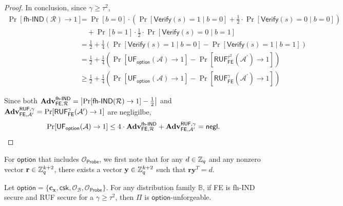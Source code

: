\begin{proof}
In conclusion, since $\gamma \geq \tau^2$,
\begin{align*}
	\Pr[\textsf{fh-IND}(\mathcal{R}) \to 1] 
	&= \Pr[b = 0] \cdot \left( \Pr[\textsf{Verify}(s) = 1 \mid b = 0] + \frac{1}{2} \cdot \Pr[\textsf{Verify}(s) = 0 \mid b = 0] \right) \\
	&\quad + \Pr[b = 1] \cdot \frac{1}{2} \cdot \Pr[\textsf{Verify}(s) = 0 \mid b = 1] \\
	&= \frac{1}{2} + \frac{1}{4} \left( \Pr[\textsf{Verify}(s) = 1 \mid b = 0] - \Pr[\textsf{Verify}(s) = 1 \mid b = 1] \right) \\
	&= \frac{1}{2} + \frac{1}{4} \left( \Pr[\textsf{UF}_{\textsf{option}}(\mathcal{A}) \to 1] - \Pr[\textsf{RUF}^{\tau^2}_{\textsf{FE}}(\mathcal{A}^\prime) \to 1 ] \right) \\
	&\geq \frac{1}{2} + \frac{1}{4} \left( \Pr[\textsf{UF}_\textsf{option}(\mathcal{A}) \to 1] - \Pr[\textsf{RUF}^{\gamma}_{\textsf{FE}}(\mathcal{A}^\prime) \to 1 ] \right)
\end{align*}

\noindent Since both $\mathbf{Adv}_{\textsf{FE}, \mathcal{R}}^\textsf{fh-IND} = \left| \Pr[\textsf{fh-IND}(\mathcal{R}) \to 1] - \frac{1}{2} \right|$ and $\mathbf{Adv}_{\textsf{FE}, \mathcal{A}^\prime}^{\textsf{RUF}, \gamma} = \Pr[\textsf{RUF}^\gamma_{\textsf{FE}}(\mathcal{A}^\prime) \to 1 ]$ are negligilbe,
\[
	\Pr[\textsf{UF}_\textsf{option}(\mathcal{A}) \to 1] \leq 4 \cdot \mathbf{Adv}_{\textsf{FE}, \mathcal{R}}^\textsf{fh-IND} + \mathbf{Adv}_{\textsf{FE}, \mathcal{A}^\prime}^{\textsf{RUF}, \gamma} = \mathsf{negl}.
\]

\end{proof}


For $\textsf{option}$ that includes $\mathcal{O}_{\textsf{Probe}}$, we first note that for any $d \in \mathbb{Z}_q$ and any nonzero vector $\mathbf{r} \in \mathbb{Z}_q^{k+2}$, there exists a vector $\mathbf{y} \in \mathbb{Z}_q^{k+2}$ such that $\mathbf{r}\mathbf{y}^T = d$.

\begin{theorem}
\label{thm:fh-IPFE:ind-uf-OB-Probe}

Let $\textsf{option} = \{\mathbf{c_x}, \textsf{csk}, \mathcal{O}_\mathcal{B}, \mathcal{O}_\textsf{Probe}\}$. For any distribution family $\mathbb{B}$, if \textsf{FE} is fh-IND secure and RUF secure for a $\gamma \geq \tau^2$, then $\Pi$ is $\textsf{option}$-unforgeable. 
\end{theorem}


